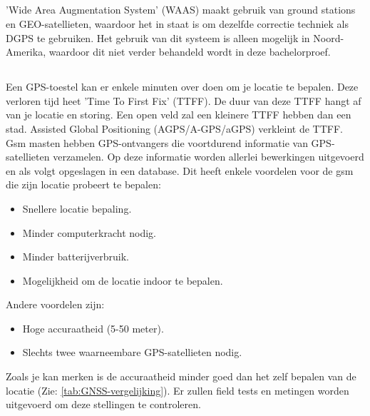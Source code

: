 \subsection{}
'Wide Area Augmentation System' (WAAS) maakt gebruik van ground stations en GEO-satellieten, waardoor het in staat is om dezelfde correctie techniek als DGPS te gebruiken. \autocite{waas} Het gebruik van dit systeem is alleen mogelijk in Noord-Amerika, waardoor dit niet verder behandeld wordt in deze bachelorproef. 

\subsection{}
Een GPS-toestel kan er enkele minuten over doen om je locatie te bepalen. Deze verloren tijd heet 'Time To First Fix' (TTFF). De duur van deze TTFF hangt af van je locatie en storing. Een open veld zal een kleinere TTFF hebben dan een stad. Assisted Global Positioning (AGPS/A-GPS/aGPS) verkleint de TTFF. 
\newline
Gsm masten hebben GPS-ontvangers die voortdurend informatie van GPS-satellieten verzamelen. Op deze informatie worden allerlei bewerkingen uitgevoerd en als volgt opgeslagen in een database. Dit heeft enkele voordelen voor de gsm die zijn locatie probeert te bepalen:
\begin{itemize}
	\item Snellere locatie bepaling.
	\item Minder computerkracht nodig.
	\item Minder batterijverbruik.
	\item Mogelijkheid om de locatie indoor te bepalen.
\end{itemize} 
Andere voordelen zijn:
\begin{itemize}
	\item Hoge accuraatheid (5-50 meter).
	\item Slechts twee waarneembare GPS-satellieten nodig.
\end{itemize}
Zoals je kan merken is de accuraatheid minder goed dan het zelf bepalen van de locatie (Zie: \ref{tab:GNSS-vergelijking}). Er zullen field tests en metingen worden uitgevoerd om deze stellingen te controleren. \autocite{agps}
